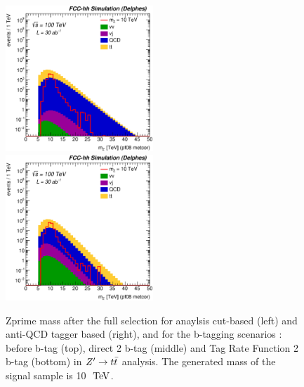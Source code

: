 \documentclass{cernrep}
\begin{document}
\begin{figure}[!htb]
\includegraphics[width=0.495\textwidth]{Fig/Zptt/Mj1j2_pf08_MetCorr_fit_sel7_nostack_log.eps}
\includegraphics[width=0.495\textwidth]{Fig/Zptt/Mj1j2_pf08_MetCorr_fit_sel8_nostack_log.eps}
\caption{Zprime mass after the full selection for anaylsis cut-based (left) and anti-QCD tagger based (right), and for the b-tagging scenarios : before b-tag (top), direct 2 b-tag (middle) and Tag Rate Function 2 b-tag (bottom) in $Z^{\prime} \rightarrow t\bar{t}$ analysis. The generated mass of the signal sample is 10 $\TeV$.}
\label{fig:Zptt_mass_sel_final}
\end{figure}
\end{document}
